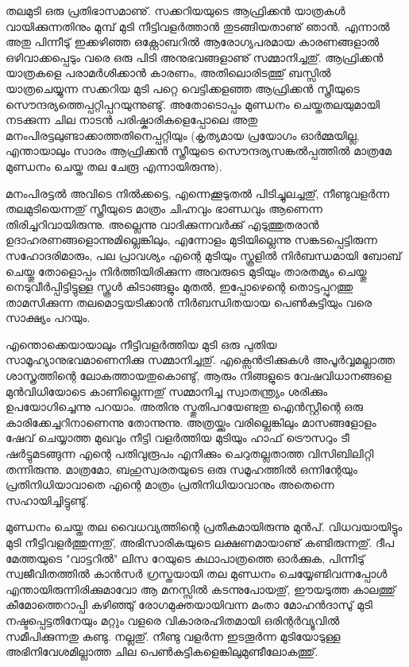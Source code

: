 \vskip 2pt

തലമുടി ഒരു പ്രതിഭാസമാണു്. സക്കറിയയുടെ ആഫ്രിക്കന്‍ യാത്രകള്‍ വായിക്കുന്നതിനും മുമ്പ് മുടി നീട്ടിവളര്‍ത്താന്‍ 
തുടങ്ങിയതാണു് ഞാന്‍. എന്നാല്‍ അതു പിന്നീടു് ഇക്കഴിഞ്ഞ ഒക്റ്റോബറില്‍ ആരോഗ്യപരമായ കാരണങ്ങളാല്‍ 
ഒഴിവാക്കപ്പെടും വരെ ഒരു പിടി അനുഭവങ്ങളാണു് സമ്മാനിച്ചതു്. ആഫ്രിക്കന്‍ യാത്രകളെ പരാമര്‍ശിക്കാന്‍ കാരണം, 
അതിലൊരിടത്തു് ബസ്സില്‍ യാത്രചെയ്യുന്ന സക്കറിയ മുടി പറ്റെ വെട്ടിക്കളഞ്ഞ ആഫ്രിക്കന്‍ സ്ത്രീയുടെ 
സൌന്ദര്യത്തെപ്പറ്റിപ്പറയുന്നുണ്ടു്. അതോടൊപ്പം മുണ്ഡനം ചെയ്തതലയുമായി നടക്കുന്ന ചില നാടന്‍ 
പരിഷ്കാരികളെപ്പോലെ അതു മനംപിരട്ടലുണ്ടാക്കാത്തതിനെപ്പറ്റിയും (കൃത്യമായ പ്രയോഗം ഓര്‍മ്മയില്ല, എന്തായാലും 
സാരം ആഫ്രിക്കന്‍ സ്ത്രീയുടെ സൌന്ദര്യസങ്കല്‍പ്പത്തില്‍ മാത്രമേ മുണ്ഡനം ചെയ്ത തല ചേരൂ എന്നായിരുന്നു).

മനംപിരട്ടല്‍ അവിടെ നില്‍ക്കട്ടെ, എന്നെക്കൂടുതല്‍ പിടിച്ചുലച്ചതു്, നീണ്ടുവളര്‍ന്ന തലമുടിയെന്നതു് സ്ത്രീയുടെ മാത്രം ചിഹ്നവും 
ഭാണ്ഡവും ആണെന്ന തിരിച്ചറിവായിരുന്നു. അല്ലെന്നു വാദിക്കുന്നവര്‍ക്കു് എടുത്തുതരാന്‍ ഉദാഹരണങ്ങളൊന്നുമില്ലെങ്കിലും, 
എന്നോളം മുടിയില്ലെന്നു സങ്കടപ്പെട്ടിരുന്ന സഹോദരിമാരും, പല പ്രാവശ്യം എന്റെ മുടിയും സ്കൂളില്‍ നിര്‍ബന്ധമായി ബോബ് 
ചെയ്തു തോളൊപ്പം നിര്‍ത്തിയിരിക്കുന്ന അവരുടെ മുടിയും താരതമ്യം ചെയ്തു നെടുവീര്‍പ്പിട്ടിട്ടുള്ള സ്കൂള്‍ കിടാങ്ങളും മുതല്‍, 
ഇപ്പോഴെന്റെ തൊട്ടപ്പുറത്തു താമസിക്കുന്ന തലമൊട്ടയടിക്കാന്‍ നിര്‍ബന്ധിതയായ പെണ്‍കുട്ടിയും വരെ സാക്ഷ്യം പറയും.

എന്തൊക്കെയായാലും നീട്ടിവളര്‍ത്തിയ മുടി ഒരു പുതിയ സാമൂഹ്യാനുഭവമാണെനിക്കു സമ്മാനിച്ചതു്. എക്സെന്‍ട്രിക്കുകള്‍ 
അപൂര്‍വ്വമല്ലാത്ത ശാസ്ത്രത്തിന്റെ ലോകത്തായതുകൊണ്ടു്, ആരും നിങ്ങളുടെ വേഷവിധാനങ്ങളെ മുന്‍വിധിയോടെ 
കാണില്ലെന്നതു് സമ്മാനിച്ച സ്വാതന്ത്ര്യം ശരിക്കും ഉപയോഗിച്ചെന്നു പറയാം. അതിനു സ്തുതിപറയേണ്ടതു ഐന്‍സ്റ്റീന്റെ 
ഒരു കാരിക്കേച്ചറിനാണെന്നു തോന്നുന്നു. അത്രയ്ക്കും വരില്ലെങ്കിലും മാസങ്ങളോളം ഷേവ് ചെയ്യാത്ത മുഖവും നീട്ടി വളര്‍ത്തിയ 
മുടിയും ഹാഫ് ട്രൌസറും ടീ ഷര്‍ട്ടുമടങ്ങുന്ന എന്റെ പതിവുരൂപം എനിക്കും ചെറുതല്ലതാത്ത വിസിബിലിറ്റി തന്നിരുന്നു. 
മാത്രമോ, ബഹുസ്വരതയുടെ ഒരു സമൂഹത്തില്‍ ഒന്നിന്റേയും പ്രതിനിധിയാവാതെ എന്റെ മാത്രം പ്രതിനിധിയാവാനും 
അതെന്നെ സഹായിച്ചിട്ടുണ്ടു്.

മുണ്ഡനം ചെയ്ത തല വൈധവ്യത്തിന്റെ പ്രതീകമായിരുന്നു മുന്‍പ്. വിധവയായിട്ടും മുടി നീട്ടിവളര്‍ത്തുന്നതു്, അഭിസാരികയുടെ 
ലക്ഷണമായാണു് കണ്ടിരുന്നതു്. ദീപ മേത്തയുടെ "വാട്ടറില്‍" ലിസ റേയുടെ കഥാപാത്രത്തെ ഓര്‍ക്കുക, പിന്നീടു് 
സ്വജീവിതത്തില്‍ കാന്‍സര്‍ ഗ്രസ്തയായി തല മുണ്ഡനം ചെയ്യേണ്ടിവന്നപ്പോള്‍ എന്തായിരുന്നിരിക്കുമാവോ ആ മനസ്സില്‍ 
കടന്നുപോയതു്, ഈയടുത്ത കാലത്തു് കീമോത്തെറാപ്പി കഴിഞ്ഞു് രോഗമുക്തയായിവന്ന മംതാ മോഹന്‍ദാസു് മുടി 
നഷ്ടപ്പെട്ടതിനേയും മറ്റും വളരെ വികാരരഹിതമായി ഒരിന്റര്‍വ്യൂവില്‍ സമീപിക്കുന്നതു കണ്ടു. നല്ലതു്. നീണ്ടു വളര്‍ന്ന ഇടതൂര്‍ന്ന 
മുടിയോടുള്ള അഭിനിവേശമില്ലാത്ത ചില പെണ്‍കുട്ടികളെങ്കിലുമുണ്ടീലോകത്തു്.

